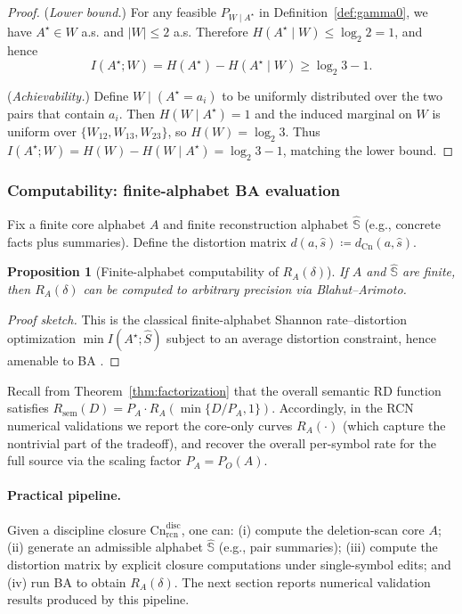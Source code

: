 \documentclass[twoside]{article}
\newtheorem{proposition}[theorem]{Proposition}
\newcommand{\Cn}{\mathrm{Cn}}
\newcommand{\sem}{\mathrm{sem}}
\newcommand{\1}{\mathbf{1}}
\begin{document}
\begin{proof}
(\emph{Lower bound.})
For any feasible \(P_{W\mid A^\star}\) in Definition~\ref{def:gamma0}, we have \(A^\star\in W\) a.s. and \(|W|\le 2\) a.s.
Therefore \(H(A^\star\mid W)\le \log_2 2 = 1\), and hence
\[
I(A^\star;W)=H(A^\star)-H(A^\star\mid W)\ge \log_2 3 - 1.
\]

(\emph{Achievability.})
Define \(W\mid(A^\star=a_i)\) to be uniformly distributed over the two pairs that contain \(a_i\).
Then \(H(W\mid A^\star)=1\) and the induced marginal on \(W\) is uniform over \(\{W_{12},W_{13},W_{23}\}\), so \(H(W)=\log_2 3\).
Thus \(I(A^\star;W)=H(W)-H(W\mid A^\star)=\log_2 3 - 1\), matching the lower bound.
\end{proof}

\subsubsection{Computability: finite-alphabet BA evaluation}
\label{sec:rcn-ba-theory}

Fix a finite core alphabet \(A\) and finite reconstruction alphabet \(\hat{\mathbb{S}}\) (e.g., concrete facts plus summaries).
Define the distortion matrix \(d(a,\hat{s})\coloneqq d_{\Cn}(a,\hat{s})\).

\begin{proposition}[Finite-alphabet computability of \(R_A(\delta)\)]
\label{prop:finite-compute-again}
If \(A\) and \(\hat{\mathbb{S}}\) are finite, then \(R_A(\delta)\) can be computed to arbitrary precision via Blahut--Arimoto.
\end{proposition}

\begin{proof}[Proof sketch]
This is the classical finite-alphabet Shannon rate--distortion optimization
\(\min I(A^\star;\hat{S})\) subject to an average distortion constraint, hence amenable to BA
\cite{cover2006elements,csizsar2011information}.
\end{proof}

Recall from Theorem~\ref{thm:factorization} that the overall semantic RD function satisfies
\(R_{\sem}(D)=P_A\cdot R_A(\min\{D/P_A,1\})\).
Accordingly, in the RCN numerical validations we report the core-only curves \(R_A(\cdot)\) (which capture the nontrivial part of the tradeoff),
and recover the overall per-symbol rate for the full source via the scaling factor \(P_A=P_O(A)\).

\paragraph{Practical pipeline.}
Given a discipline closure \(\Cn^{\mathrm{disc}}_{\mathrm{rcn}}\), one can:
(i) compute the deletion-scan core \(A\);
(ii) generate an admissible alphabet \(\hat{\mathbb{S}}\) (e.g., pair summaries);
(iii) compute the distortion matrix by explicit closure computations under single-symbol edits; and
(iv) run BA to obtain \(R_A(\delta)\).
The next section reports numerical validation results produced by this pipeline.
\end{document}
